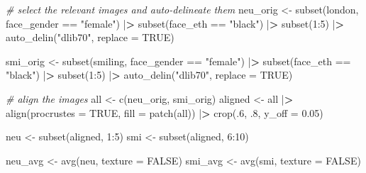 \documentclass[
  doc,floatsintext]{apa6}
\newenvironment{Shaded}{\begin{snugshade}}{\end{snugshade}}
\newcommand{\AttributeTok}[1]{\textcolor[rgb]{0.77,0.63,0.00}{#1}}
\newcommand{\CommentTok}[1]{\textcolor[rgb]{0.56,0.35,0.01}{\textit{#1}}}
\newcommand{\ConstantTok}[1]{\textcolor[rgb]{0.00,0.00,0.00}{#1}}
\newcommand{\DecValTok}[1]{\textcolor[rgb]{0.00,0.00,0.81}{#1}}
\newcommand{\ErrorTok}[1]{\textcolor[rgb]{0.64,0.00,0.00}{\textbf{#1}}}
\newcommand{\FloatTok}[1]{\textcolor[rgb]{0.00,0.00,0.81}{#1}}
\newcommand{\FunctionTok}[1]{\textcolor[rgb]{0.00,0.00,0.00}{#1}}
\newcommand{\NormalTok}[1]{#1}
\newcommand{\OtherTok}[1]{\textcolor[rgb]{0.56,0.35,0.01}{#1}}
\newcommand{\SpecialCharTok}[1]{\textcolor[rgb]{0.00,0.00,0.00}{#1}}
\newcommand{\StringTok}[1]{\textcolor[rgb]{0.31,0.60,0.02}{#1}}
\begin{document}
\begin{Shaded}
\begin{Highlighting}[]
\CommentTok{\# select the relevant images and auto{-}delineate them}
\NormalTok{neu\_orig }\OtherTok{\textless{}{-}} \FunctionTok{subset}\NormalTok{(london, face\_gender }\SpecialCharTok{==} \StringTok{"female"}\NormalTok{) }\SpecialCharTok{|}\ErrorTok{\textgreater{}} 
  \FunctionTok{subset}\NormalTok{(face\_eth }\SpecialCharTok{==} \StringTok{"black"}\NormalTok{) }\SpecialCharTok{|}\ErrorTok{\textgreater{}} \FunctionTok{subset}\NormalTok{(}\DecValTok{1}\SpecialCharTok{:}\DecValTok{5}\NormalTok{) }\SpecialCharTok{|}\ErrorTok{\textgreater{}}
  \FunctionTok{auto\_delin}\NormalTok{(}\StringTok{"dlib70"}\NormalTok{, }\AttributeTok{replace =} \ConstantTok{TRUE}\NormalTok{)}

\NormalTok{smi\_orig }\OtherTok{\textless{}{-}} \FunctionTok{subset}\NormalTok{(smiling, face\_gender }\SpecialCharTok{==} \StringTok{"female"}\NormalTok{) }\SpecialCharTok{|}\ErrorTok{\textgreater{}} 
  \FunctionTok{subset}\NormalTok{(face\_eth }\SpecialCharTok{==} \StringTok{"black"}\NormalTok{) }\SpecialCharTok{|}\ErrorTok{\textgreater{}} \FunctionTok{subset}\NormalTok{(}\DecValTok{1}\SpecialCharTok{:}\DecValTok{5}\NormalTok{) }\SpecialCharTok{|}\ErrorTok{\textgreater{}}
  \FunctionTok{auto\_delin}\NormalTok{(}\StringTok{"dlib70"}\NormalTok{, }\AttributeTok{replace =} \ConstantTok{TRUE}\NormalTok{)}

\CommentTok{\# align the images}
\NormalTok{all }\OtherTok{\textless{}{-}} \FunctionTok{c}\NormalTok{(neu\_orig, smi\_orig) }
\NormalTok{aligned }\OtherTok{\textless{}{-}}\NormalTok{ all }\SpecialCharTok{|}\ErrorTok{\textgreater{}}
  \FunctionTok{align}\NormalTok{(}\AttributeTok{procrustes =} \ConstantTok{TRUE}\NormalTok{, }\AttributeTok{fill =} \FunctionTok{patch}\NormalTok{(all)) }\SpecialCharTok{|}\ErrorTok{\textgreater{}}
  \FunctionTok{crop}\NormalTok{(.}\DecValTok{6}\NormalTok{, .}\DecValTok{8}\NormalTok{, }\AttributeTok{y\_off =} \FloatTok{0.05}\NormalTok{)}

\NormalTok{neu }\OtherTok{\textless{}{-}} \FunctionTok{subset}\NormalTok{(aligned, }\DecValTok{1}\SpecialCharTok{:}\DecValTok{5}\NormalTok{)}
\NormalTok{smi }\OtherTok{\textless{}{-}} \FunctionTok{subset}\NormalTok{(aligned, }\DecValTok{6}\SpecialCharTok{:}\DecValTok{10}\NormalTok{)}

\NormalTok{neu\_avg }\OtherTok{\textless{}{-}} \FunctionTok{avg}\NormalTok{(neu, }\AttributeTok{texture =} \ConstantTok{FALSE}\NormalTok{)}
\NormalTok{smi\_avg }\OtherTok{\textless{}{-}} \FunctionTok{avg}\NormalTok{(smi, }\AttributeTok{texture =} \ConstantTok{FALSE}\NormalTok{)}
\end{Highlighting}
\end{Shaded}
\end{document}
